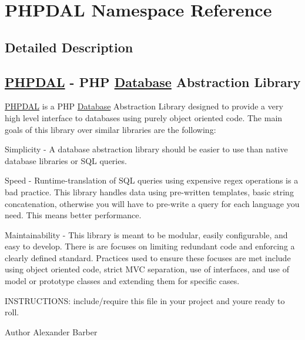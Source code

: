 \hypertarget{namespace_p_h_p_d_a_l}{}\section{P\+H\+P\+D\+A\+L Namespace Reference}
\label{namespace_p_h_p_d_a_l}


\subsection{Detailed Description}
\subsection*{\hyperlink{namespace_p_h_p_d_a_l}{P\+H\+P\+D\+A\+L} -\/ P\+H\+P \hyperlink{class_database}{Database} Abstraction Library }

\hyperlink{namespace_p_h_p_d_a_l}{P\+H\+P\+D\+A\+L} is a P\+H\+P \hyperlink{class_database}{Database} Abstraction Library designed to provide a very high level interface to databases using purely object oriented code. The main goals of this library over similar libraries are the following\+:

Simplicity -\/ A database abstraction library should be easier to use than native database libraries or S\+Q\+L queries.

Speed -\/ Runtime-\/translation of S\+Q\+L queries using expensive regex operations is a bad practice. This library handles data using pre-\/written templates, basic string concatenation, otherwise you will have to pre-\/write a query for each language you need. This means better performance.

Maintainability -\/ This library is meant to be modular, easily configurable, and easy to develop. There is are focuses on limiting redundant code and enforcing a clearly defined standard. Practices used to ensure these focuses are met include using object oriented code, strict M\+V\+C separation, use of interfaces, and use of model or prototype classes and extending them for specific cases.

I\+N\+S\+T\+R\+U\+C\+T\+I\+O\+N\+S\+: include/require this file in your project and you\textquotesingle{}re ready to roll.

\begin{DoxyAuthor}{Author}
Alexander Barber 
\end{DoxyAuthor}
